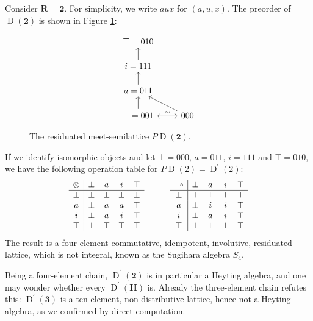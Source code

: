 \documentclass[reqno]{amsart}
\theoremstyle{plain}
\theoremstyle{definition}
\DeclareMathOperator{\D}{D}
\newcommand{\cf}[1]{\mathbf{#1}}
\begin{document}
Consider $ \cf{R} = \mathbf{2} $. For simplicity, we write $ aux $ for $ (a,u,x) $. The preorder of $ \D(\mathbf{2}) $ is shown in Figure \ref{fig: D(2)}:
\begin{figure}
$$
\begin{tikzcd}[row sep = 15]
\top= 010 &  \\
i= 111 \ar{u} &   \\
a=011 \ar{u} &  \\
\bot= 001 \ar{u} \ar["\sim"]{r} & 000 \ar{ul} \ar{l}
\end{tikzcd}
$$ 
\caption{The residuated meet-semilattice $ P \D (\mathbf{2})$.}\label{fig: D(2)}
\end{figure}
 If we identify isomorphic objects and let $ \bot = 000$, $a = 011$, $ i = 111$ and $\top = 010$, we have the following operation table for $P\D(2) = \D^{\prime}(2)$:
\begin{equation} \label{eqn: min noncom mult table}
\begin{array}{c | c c c c}
\otimes     & \bot & a & i & \top \\
\hline  \bot & \bot & \bot & \bot & \bot \\
a & \bot & a & a & \top \\
i & \bot & a & i & \top \\
\top & \bot & \top & \top & \top
\end{array}
\hskip 3 em
\begin{array}{c | c c c c}
\multimap    & \bot & a & i & \top \\
\hline       \bot & \top & \top & \top & \top \\
a & \bot & i & i & \top \\
i & \bot & a & i & \top \\
\top & \bot & \bot & \bot & \top
\end{array}
\end{equation}
The result is a four-element commutative, idempotent, involutive, residuated lattice, which is not integral, known as the Sugihara algebra $S_4$. \cite{sugihara1955}

Being a four-element chain, $\D^{\prime}(\mathbf{2})$ is in particular a Heyting algebra, and one may wonder whether every $\D^{\prime}(\cf{H})$ is. Already the three-element chain refutes this: $\D^{\prime}(\cf{3})$ is a ten-element, non-distributive lattice, hence not a Heyting algebra, as we confirmed by direct computation.
\end{document}
